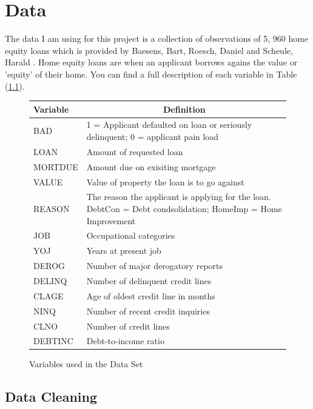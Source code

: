 \chapter{Data} \label{cha:chapter-2}

The data I am using for this project is a collection of observations of 5, 960 home equity loans which is provided by Baesens,  Bart,  Roesch,  Daniel and Scheule,  Harald \cite{baesens2016credit}. Home equity loans are when an applicant borrows agains the value or 'equity' of their home. You can find a full description of each variable in Table (\ref{MetaData}).

\begin{figure}[ht]\label{Table2}
	\centering
	\renewcommand{\arraystretch}{1.5}
	\begin{tabular}{l p{10cm}}
	\hline
	Variable & \multicolumn{1}{c}{Definition}\\ 
	\hline
	BAD & 1 = Applicant defaulted on loan or seriously delinquent; 0 = applicant pain load \\
	LOAN & Amount of requested loan \\
	MORTDUE & Amount due on exisiting mortgage \\
	VALUE & Value of property the loan is to go against \\
	REASON & The reason the applicant is applying for the loan. DebtCon = Debt condsolidation; HomeImp = Home Improvement \\
	JOB & Occupational categories \\
	YOJ & Years at present job \\
	DEROG & Number of major derogatory reports \\
	DELINQ & Number of delinquent credit lines \\
	CLAGE & Age of oldest credit line in months \\
	NINQ & Number of recent credit inquiries \\
	CLNO & Number of credit lines \\
	DEBTINC & Debt-to-income ratio \\
	\end{tabular}
	\caption{Variables used in the Data Set \cite{baesens2016credit} \label{MetaData}}
\end{figure}

\section{Data Cleaning}

